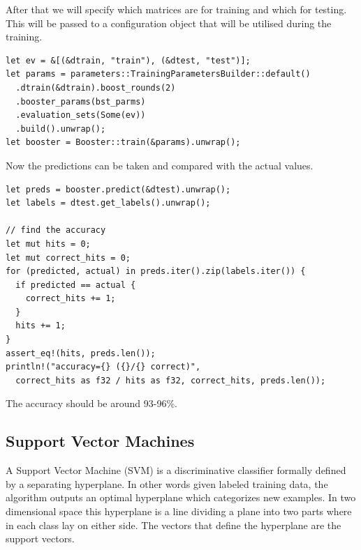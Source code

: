 \documentclass{book}
\begin{document}
After that we will specify which matrices are for training and which for testing. This will be passed to a configuration object that will be utilised during the training.

\begin{lstlisting}[caption={chapter3\\/iris\_classification\_xgboost\\/src\\/main\\.rs}]
let ev = &[(&dtrain, "train"), (&dtest, "test")];
let params = parameters::TrainingParametersBuilder::default()
  .dtrain(&dtrain).boost_rounds(2)
  .booster_params(bst_parms)
  .evaluation_sets(Some(ev))
  .build().unwrap();
let booster = Booster::train(&params).unwrap();
\end{lstlisting}

Now the predictions can be taken and compared with the actual values.

\begin{lstlisting}[caption={chapter3\\/iris\_classification\_xgboost\\/src\\/main\\.rs}]
let preds = booster.predict(&dtest).unwrap();
let labels = dtest.get_labels().unwrap();

// find the accuracy
let mut hits = 0;
let mut correct_hits = 0;
for (predicted, actual) in preds.iter().zip(labels.iter()) {
  if predicted == actual {
    correct_hits += 1;
  }
  hits += 1;
}
assert_eq!(hits, preds.len());
println!("accuracy={} ({}/{} correct)",
  correct_hits as f32 / hits as f32, correct_hits, preds.len());
\end{lstlisting}

The accuracy should be around 93-96\%.

\label{par:rust_xgboost}

\label{sub:xgboost}

\subsection{Support Vector Machines}%
A Support Vector Machine (SVM) is a discriminative classifier formally defined by a separating hyperplane. In other words given labeled training data, the algorithm outputs an optimal hyperplane which categorizes new examples. In two dimensional space this hyperplane is a line dividing a plane into two parts where in each class lay on either side. The vectors that define the hyperplane are the support vectors.
\end{document}
